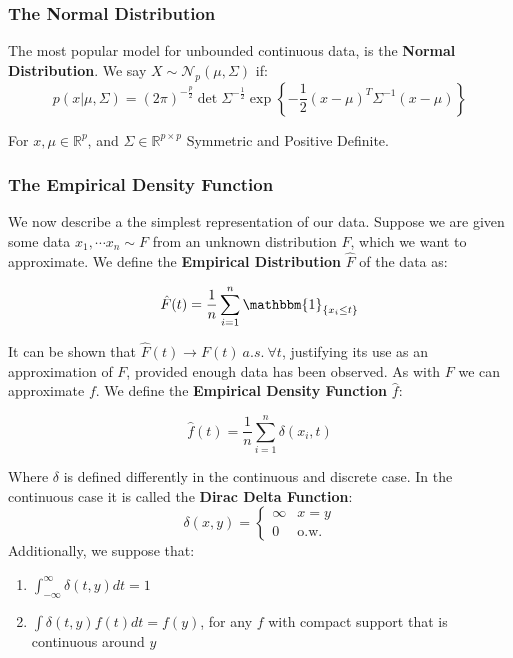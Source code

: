 \documentclass[]{article}
\theoremstyle{mattstyle}
\theoremstyle{definition}
\begin{document}
\subsubsection{The Normal Distribution}

The most popular model for unbounded continuous data, is the \textbf{Normal Distribution}. We say \(X \sim \mathcal{N}_p(\mu, \Sigma)\) if:
$$p(x|\mu, \Sigma)={(2\pi)}^{-\frac{p}{2}}\det \Sigma^{-\frac{1}{2}}\exp{ \left\{-\frac{1}{2}(x-\mu)^T\Sigma^{-1}(x-\mu) \right\} } $$

For \(x, \mu\in\mathbb{R}^p\), and \(\Sigma \in \mathbb{R}^{p \times p}\) Symmetric and Positive Definite.


\subsubsection{The Empirical Density Function}

We now describe a the simplest representation of our data. Suppose we are given some data \(x_1, \cdots x_n \sim F\) from an unknown distribution $F$, which we want to approximate. We define the \textbf{Empirical Distribution} $\hat{F}$ of the data as:

\begin{equation}\label{sec:empdist}
\hat{F}(t) = \frac{1}{n}\sum_{i=1}^n \mathbbm{1}_{\{x_i \le t\}}
\end{equation} 

It can be shown that $\hat{F}(t) \rightarrow F(t) \ a.s.\ \forall t$, justifying its use as an approximation of $F$, provided enough data has been observed. As with $F$ we can approximate $f$. We define the \textbf{Empirical Density Function} $\hat{f}$:

\begin{equation}
\hat{f}(t) = \frac{1}{n}\sum_{i=1}^n \delta(x_i, t)
\end{equation}

Where $\delta$ is defined differently in the continuous and discrete case. In the continuous case it is called the \textbf{Dirac Delta Function}:
\begin{equation}
\delta(x,y) = \begin{cases}
\infty & x=y \\
0 & \text{o.w.}
\end{cases}
\end{equation}
Additionally, we suppose that:
\begin{enumerate}
	\item $\int_{-\infty}^{\infty} \delta(t,y)dt = 1$
	\item $\int \delta(t,y) f(t) dt = f(y)$, for any $f$ with compact support that is continuous around $y$
\end{enumerate}
\end{document}
